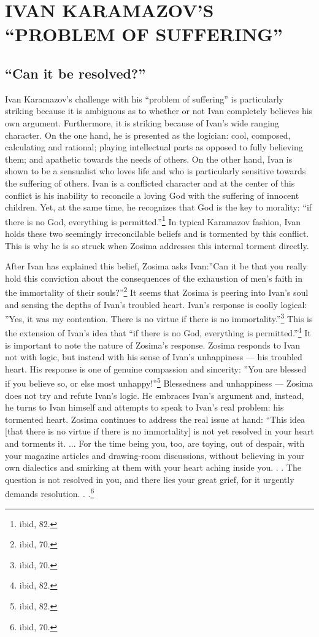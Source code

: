 \chapter{IVAN KARAMAZOV'S ``PROBLEM OF SUFFERING''}
\section{``Can it be resolved?''}
Ivan Karamazov's challenge with his ``problem of suffering'' is particularly striking because it is ambiguous as to whether or not Ivan completely believes his own argument. Furthermore, it is striking because of Ivan's wide ranging character. On the one hand, he is presented as the logician: cool, composed, calculating and rational; playing intellectual parts as opposed to fully believing them; and apathetic towards the needs of others. On the other hand, Ivan is shown to be a sensualist who loves life and who is particularly sensitive towards the suffering of others. Ivan is a conflicted character and at the center of this conflict is his inability to reconcile a loving God with the suffering of innocent children. Yet, at the same time, he recognizes that God is the key to morality: ``if there is no God, everything is permitted.''\footnote{ibid, 82.} In typical Karamazov fashion, Ivan holds these two seemingly irreconcilable beliefs and is tormented by this conflict. This is why he is so struck when Zosima addresses this internal torment directly.

After Ivan has explained this belief, Zosima asks Ivan:''Can it be that you really hold this conviction about the consequences of the exhaustion of men's faith in the immortality of their souls?''\footnote{ibid, 70.} It seems that Zosima is peering into Ivan's soul and sensing the depths of Ivan's troubled heart. Ivan's response is coolly logical: ''Yes, it was my contention. There is no virtue if there is no immortality.''\footnote{ibid, 70.} This is the extension of Ivan's idea that ``if there is no God, everything is permitted.''\footnote{ibid, 82.} It is important to note the nature of Zosima's response. Zosima responds to Ivan not with logic, but instead with his sense of Ivan's unhappiness --- his troubled heart. His response is one of genuine compassion and sincerity: ''You are blessed if you believe so, or else most unhappy!''\footnote{ibid, 82.} Blessedness and unhappiness --- Zosima does not try and refute Ivan's logic. He embraces Ivan's argument and, instead, he turns to Ivan himself and attempts to speak to Ivan's real problem: his tormented heart. Zosima continues to address the real issue at hand: ``This idea [that there is no virtue if there is no immortality] is not yet resolved in your heart and torments it. ... For the time being you, too, are toying, out of despair, with your magazine articles and drawing-room discussions, without believing in your own dialectics and smirking at them with your heart aching inside you. . . The question is not resolved in you, and there lies your great grief, for it urgently demands resolution. . .\footnote{ibid, 70.}

